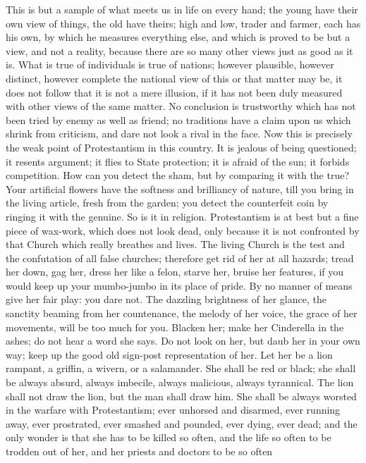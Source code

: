 This is but a sample of what meets us in life on every
hand; the young have their own view of things, the old
have theirs; high and low, trader and farmer, each has
his own, by which he measures everything else, and which
is proved to be but a view, and not a reality, because
there are so many other views just as good as it is. What
is true of individuals is true of nations; however
plausible, however distinct, however complete the
national view of this or that matter may be, it does not
follow that it is not a mere illusion, if it has not been
duly measured with other views of the same matter. No
conclusion is trustworthy which has not been tried by
enemy as well as friend; no traditions have a claim upon
us which shrink from criticism, and dare not look a rival
in the face. Now this is precisely the weak point of
Protestantism in this country. It is jealous of being
questioned; it resents argument; it flies to State
protection; it is afraid of the sun; it forbids
competition. How can you detect the sham, but by
comparing it with the true? Your artificial flowers have
the softness and brilliancy of nature, till you bring in
the living article, fresh from the garden; you detect the
counterfeit coin by ringing it with the genuine. So is it
in religion. Protestantism is at best but a fine piece of
wax-work, which does not look dead, only because it is
not confronted by that Church which really breathes and
lives. The living Church is the test and the confutation
of all false churches; therefore get rid of her at all
hazards; tread her down, gag her, dress her like a felon,
starve her, bruise her features, if you would keep up
your mumbo-jumbo in its place of pride. By no manner of
means give her fair play: you dare not. The dazzling
brightness of her glance, the sanctity beaming from her
countenance, the melody of her voice, the grace of her
movements, will be too much for you. Blacken her; make
her Cinderella in the ashes; do not hear a word she says.
Do not look on her, but daub her in your own way; keep up
the good old sign-post representation of her. Let her be
a lion rampant, a griffin, a wivern, or a salamander. She
shall be red or black; she shall be always absurd, always
imbecile, always malicious, always tyrannical. The lion
shall not draw the lion, but the man shall draw him. She
shall be always worsted in the warfare with
Protestantism; ever unhorsed and disarmed, ever running
away, ever prostrated, ever smashed and pounded, ever
dying, ever dead; and the only wonder is that she has to
be killed so often, and the life so often to be trodden
out of her, and her priests and doctors to be so often
